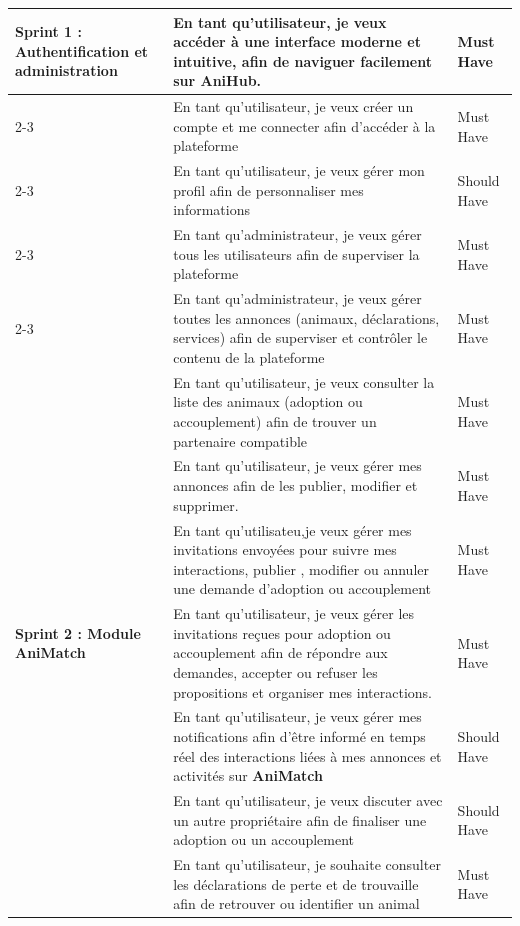 \begin{longtable}{|p{4cm}|p{9.5cm}|p{2cm}|}
\multirow{5}{4cm}{\textbf{Sprint 1 : Authentification et administration}} 
& En tant qu'utilisateur, je veux accéder à une interface moderne et intuitive, afin de naviguer facilement sur AniHub. & Must Have \\
\cline{2-3}
& En tant qu'utilisateur, je veux créer un compte et me connecter afin d'accéder à la plateforme & Must Have \\
\cline{2-3}
& En tant qu'utilisateur, je veux gérer mon profil afin de personnaliser mes informations & Should Have \\
\cline{2-3}
& En tant qu'administrateur, je veux gérer tous les utilisateurs afin de superviser la plateforme & Must Have \\
\cline{2-3}
& En tant qu'administrateur, je veux gérer toutes les annonces (animaux, déclarations, services) afin de superviser et contrôler le contenu de la plateforme & Must Have \\
\hline
\multirow{9}{4cm}{\textbf{Sprint 2 : Module AniMatch}}
& En tant qu’utilisateur, je veux consulter la liste des animaux (adoption ou accouplement) afin de trouver un partenaire compatible & Must Have \\
\cline{2-3}
& En tant qu’utilisateur, je veux gérer mes annonces afin de les publier, modifier et supprimer. & Must Have \\
\cline{2-3}
& En tant qu’utilisateu,je veux gérer mes invitations envoyées pour suivre mes interactions, publier , modifier ou annuler une demande d'adoption ou accouplement & Must Have \\
\cline{2-3}
& En tant qu’utilisateur, je veux gérer les invitations reçues pour adoption ou accouplement afin de répondre aux demandes, accepter ou refuser les propositions et organiser mes interactions. & Must Have \\
\cline{2-3}
& En tant qu'utilisateur, je veux gérer mes notifications afin d’être informé en temps réel des interactions liées à mes annonces et activités sur \textbf{AniMatch} & Should Have \\
\cline{2-3}
& En tant qu'utilisateur, je veux discuter avec un autre propriétaire afin de finaliser une adoption ou un accouplement & Should Have \\
\hline
\multirow{8}{4cm}{\textbf{Sprint 3 : Module AniFound}}
& En tant qu’utilisateur, je souhaite consulter les déclarations de perte et de trouvaille afin de retrouver ou identifier un animal & Must Have \\

\end{longtable}
